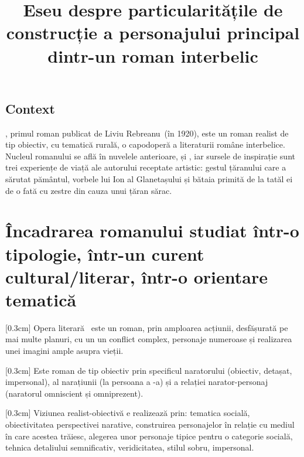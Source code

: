 

\newcommand{\operatitle}{\textbfit{„Ion”}} %
\newcommand{\operaauthor}{Liviu Rebreanu} %

\title{Eseu despre particularitățile de construcție a personajului principal dintr-un roman interbelic}



\maketitle %



\subsection{Context}

\operatitle, primul roman publicat de \operaauthor\ (în 1920), este un roman realist de tip obiectiv, cu tematică rurală, o capodoperă a literaturii române interbelice. Nucleul romanului se află în nuvelele anterioare,  și , iar sursele de inspirație sunt trei experiențe de viață ale autorului receptate artistic: gestul țăranului care a sărutat pământul, vorbele lui Ion al Glanetașului și bătaia primită de la tatăl ei de o fată cu zestre din cauza unui țăran sărac.


\section{Încadrarea romanului studiat într-o tipologie, într-un curent cultural/literar, într-o orientare tematică}

[0.3cm]
Opera literară \operatitle\ este un roman, prin amploarea acțiunii, desfășurată pe mai multe planuri, cu un un conflict complex, personaje numeroase și realizarea unei imagini ample asupra vieții.

[0.3cm]
Este roman de tip obiectiv prin specificul naratorului (obiectiv, detașat, impersonal), al narațiunii (la persoana a -a) și a relației narator-personaj (naratorul omniscient și omniprezent).

[0.3cm]
Viziunea realist-obiectivă e realizează prin: tematica socială, obiectivitatea perspectivei narative, construirea personajelor în relație cu mediul în care acestea trăiesc, alegerea unor personaje tipice pentru o categorie socială, tehnica detaliului semnificativ, veridicitatea, stilul sobru, impersonal.

